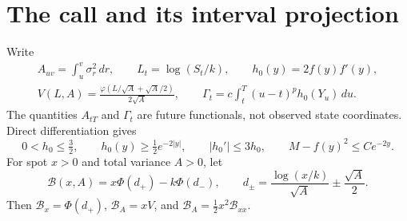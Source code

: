 \documentclass[11pt,a4paper]{amsart}
\theoremstyle{plain}
\theoremstyle{definition}
\theoremstyle{remark}
\newcommand{\ph}{\varphi}
\newcommand{\BS}{\mathcal B}
\begin{document}
\section{The call and its interval projection}\label{sec:geometry}

Write
\begin{equation}\label{eq:black-definitions}
 \begin{gathered}
 A_{uv}=\int_u^v\sigma_r^2\,dr,\qquad L_t=\log(S_t/k),
 \qquad h_0(y)=2f(y)f'(y),\\
 V(L,A)=\frac{\ph(L/\sqrt A+\sqrt A/2)}{2\sqrt A},\qquad
 \Gamma_t=c\int_t^T(u-t)^p h_0(Y_u)\,du.
 \end{gathered}
\end{equation}
The quantities $A_{tT}$ and $\Gamma_t$ are future functionals, not observed state coordinates. Direct differentiation gives
\begin{equation}\label{eq:h0-bounds}
 0<h_0\le\tfrac32,\qquad h_0(y)\ge\tfrac12 e^{-2|y|},
 \qquad |h_0'|\le3h_0,\qquad M-f(y)^2\le C e^{-2y}.
\end{equation}
For spot $x>0$ and total variance $A>0$, let
\[
 \BS(x,A)=x\Phi(d_+)-k\Phi(d_-),\qquad
 d_\pm=\frac{\log(x/k)}{\sqrt A}\pm\frac{\sqrt A}{2}.
\]
Then $\BS_x=\Phi(d_+)$, $\BS_A=xV$, and
$\BS_A=\tfrac12 x^2\BS_{xx}$.
\end{document}

